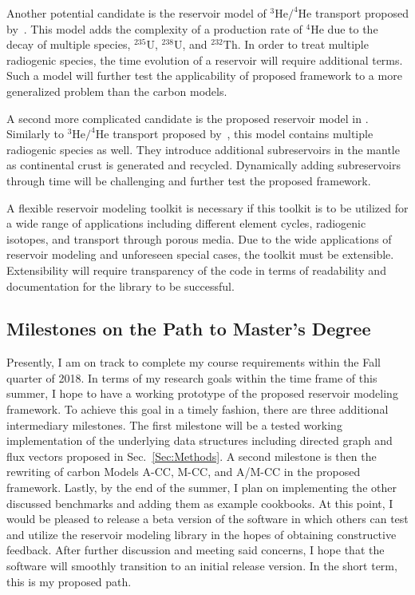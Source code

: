 Another potential candidate is the reservoir model of $^{3}\mathrm{He}/^{4}\mathrm{He}$ transport proposed by~\citet{KLH-WGJ:1990}. This model adds the complexity of a production rate of $^{4}\mathrm{He}$ due to the decay of multiple species, $^{235}\mathrm{U}$, $^{238}\mathrm{U}$, and $^{232}\mathrm{Th}$. In order to treat multiple radiogenic species, the time evolution of a reservoir  will require additional terms. Such a model will further test the applicability of proposed framework to a more generalized problem than the carbon models.

A second more complicated candidate is the proposed reservoir model in \cite{KJB-JSB-ORJ:2002}. Similarly to $^{3}\mathrm{He}/^{4}\mathrm{He}$ transport proposed by~\citet{KLH-WGJ:1990}, this model contains multiple radiogenic species as well. They introduce additional subreservoirs in the mantle as continental crust is generated and recycled. Dynamically adding subreservoirs through time will be challenging and further test the proposed framework.

A flexible reservoir modeling toolkit is necessary if this toolkit is to be utilized for a wide range of applications including different element cycles, radiogenic isotopes, and transport through porous media. Due to the wide applications of reservoir modeling and unforeseen special cases, the toolkit must be extensible. Extensibility will require transparency of the code in terms of readability and documentation for the library to be successful.

\subsection{Milestones on the Path to Master's Degree}
Presently, I am on track to complete my course requirements within the Fall quarter of 2018. In terms of my research goals within the time frame of this summer, I hope to have a working prototype of the proposed reservoir modeling framework. To achieve this goal in a timely fashion, there are three additional intermediary milestones. The first milestone will be a tested working implementation of the underlying data structures including directed graph and flux vectors proposed in Sec.~\ref{Sec:Methods}. A second milestone is then the rewriting of carbon Models A-CC, M-CC, and A/M-CC in the proposed framework. Lastly, by the end of the summer, I plan on implementing the other discussed benchmarks and adding them as example cookbooks. At this point, I would be pleased to release a beta version of the software in which others can test and utilize the reservoir modeling library in the hopes of obtaining constructive feedback. After further discussion and meeting said concerns, I hope that the software will smoothly transition to an initial release version. In the short term, this is my proposed path.
